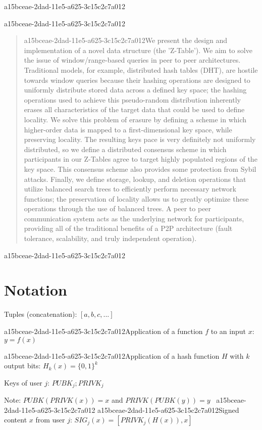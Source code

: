 \documentclass[12pt]{article}
\begin{document}
a15bceae-2dad-11e5-a625-3c15c2c7a012\maketitle

a15bceae-2dad-11e5-a625-3c15c2c7a012\begin{abstract}
a15bceae-2dad-11e5-a625-3c15c2c7a012We present the design and implementation of a novel data structure (the 'Z-Table'). We aim to solve the issue of window/range-based queries in peer to peer architectures. Traditional models, for example,  distributed hash tables (DHT), are hostile towards window queries because their hashing operations are designed to uniformly distribute stored data across a defined key space; the hashing operations used to achieve this pseudo-random distribution inherently erases all characteristics of the target data that could be used to define locality. We solve this problem of erasure by defining a scheme in which higher-order data is mapped to a first-dimensional key space, while preserving locality. The resulting keys pace is very definitely not uniformly distributed, so we define a distributed consensus scheme in which participants in our Z-Tables agree to target highly populated regions of the key space. This consensus scheme also provides some protection from Sybil attacks. Finally, we define storage, lookup, and deletion operations that utilize balanced search trees to efficiently perform necessary network functions; the preservation of locality allows us to greatly optimize these operations through the use of balanced trees. A peer to peer communication system acts as the underlying network for participants, providing all of the traditional benefits of a P2P architecture (fault tolerance, scalability, and truly independent operation).
\end{abstract}
a15bceae-2dad-11e5-a625-3c15c2c7a012
\section{Notation}

Tuples (concatenation): $[a,b,c,...]$

a15bceae-2dad-11e5-a625-3c15c2c7a012Application of a function $f$ to an input $x$: $y=f(x)$

a15bceae-2dad-11e5-a625-3c15c2c7a012Application of a hash function $H$ with $k$ output bits: $H_{k}(x) = \{0,1\}^k$

Keys of user $j$: $ PUBK_j; PRIVK_j $

Note: $PUBK(PRIVK(x)) = x$ and $PRIVK(PUBK(y)) = y$~
a15bceae-2dad-11e5-a625-3c15c2c7a012
a15bceae-2dad-11e5-a625-3c15c2c7a012Signed content $x$ from user $j$: $SIG_j(x) = \left[ PRIVK_j( H(x) ), x \right]$
\end{document}
